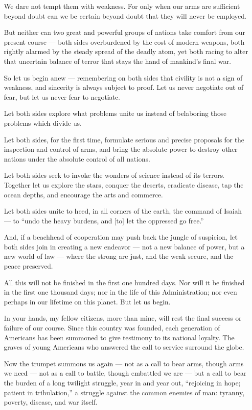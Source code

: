 \documentclass[a4paper]{amsbook}
\begin{document}
We dare not tempt them with weakness. For only when our arms are sufficient beyond doubt can we be certain beyond doubt that they will never be employed.

But neither can two great and powerful groups of nations take comfort from our present course — both sides overburdened by the cost of modern weapons, both rightly alarmed by the steady spread of the deadly atom, yet both racing to alter that uncertain balance of terror that stays the hand of mankind's final war.

So let us begin anew — remembering on both sides that civility is not a sign of weakness, and sincerity is always subject to proof. Let us never negotiate out of fear, but let us never fear to negotiate.

Let both sides explore what problems unite us instead of belaboring those problems which divide us.

Let both sides, for the first time, formulate serious and precise proposals for the inspection and control of arms, and bring the absolute power to destroy other nations under the absolute control of all nations.

Let both sides seek to invoke the wonders of science instead of its terrors. Together let us explore the stars, conquer the deserts, eradicate disease, tap the ocean depths, and encourage the arts and commerce.

Let both sides unite to heed, in all corners of the earth, the command of Isaiah — to “undo the heavy burdens, and [to] let the oppressed go free.”

And, if a beachhead of cooperation may push back the jungle of suspicion, let both sides join in creating a new endeavor — not a new balance of power, but a new world of law — where the strong are just, and the weak secure, and the peace preserved.

All this will not be finished in the first one hundred days. Nor will it be finished in the first one thousand days; nor in the life of this Administration; nor even perhaps in our lifetime on this planet. But let us begin.

In your hands, my fellow citizens, more than mine, will rest the final success or failure of our course. Since this country was founded, each generation of Americans has been summoned to give testimony to its national loyalty. The graves of young Americans who answered the call to service surround the globe.

Now the trumpet summons us again — not as a call to bear arms, though arms we need — not as a call to battle, though embattled we are — but a call to bear the burden of a long twilight struggle, year in and year out, “rejoicing in hope; patient in tribulation,” a struggle against the common enemies of man: tyranny, poverty, disease, and war itself.
\end{document}
